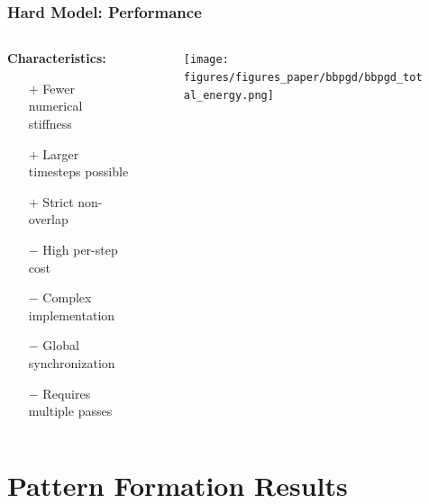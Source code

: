 \documentclass[10pt,t]{beamer}
\begin{document}
\begin{frame}
    \frametitle{Hard Model: Performance}

    \begin{columns}[c]
        \begin{column}{0.45\textwidth}
            \textbf{Characteristics:}
            \begin{itemize}
                \item[$+$] Fewer numerical stiffness
                \item[$+$] Larger timesteps possible
                \item[$+$] Strict non-overlap
                \item[$-$] High per-step cost
                \item[$-$] Complex implementation
                \item[$-$] Global synchronization
                \item[$-$] Requires multiple passes
            \end{itemize}
        \end{column}

        \begin{column}{0.6\textwidth}
            \begin{figure}
                \centering
                \texttt{[image: figures/figures\_paper/bbpgd/bbpgd\_total\_energy.png]}
            \end{figure}
        \end{column}
    \end{columns}

\end{frame}


\section{Pattern Formation Results}
\end{document}
